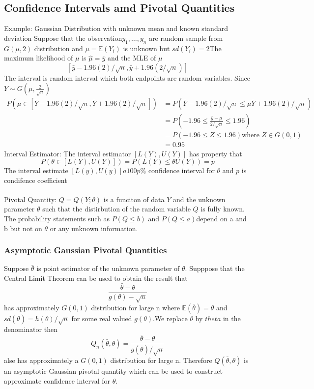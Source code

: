 \documentclass{article}
\newcommand{\E}{\mathbb{E}}
\begin{document}
\subsection{Confidence Intervals amd Pivotal Quantities}
Example: Gaussian Distribution with unknown mean and known standard deviation
Suppose that the observation$y_1, \dotsc, y_n$ are random sample from $G(\mu, 2)$ distribution and $\mu = \E(Y_i)$ is unknown but $sd(Y_i) = 2$The maximum likelihood of $\mu$ is $\hat{\mu} = \bar{y}$ and the MLE of $\mu$
\[
\left[\bar{y} - 1.96(2)/\sqrt{n}, \bar{y} + 1.96(2/\sqrt{n})\right]
\] 
The interval is random interval which both endpoints are random variables. Since $Y \sim G(\mu, \frac{2}{\sqrt{n}})$
\begin{align*}
    P\left(\mu \in \left[\bar{Y} - 1.96(2)/\sqrt{n}, \bar{Y}+ 1.96(2)/\sqrt{n}\right]\right) &= P(\bar{Y} - 1.96(2)/\sqrt{n} \le \mu \bar{Y} + 1.96(2)/\sqrt{n})\\
    &= P(-1.96\le \frac{\bar{y} -\mu}{2/\sqrt{n}} \le 1.96)\\
    &= P(-1.96 \le Z \le 1.96) \text{where }Z\in G(0,1)\\
    &= 0.95
\end{align*}
\noindent Interval Estimator: The interval estimator $\left[L(Y),U(Y)\right]$ has property that
\[
P(\theta \in \left[L(Y), U(Y)\right]) = P(L(Y) \le \theta U(Y)) = p
\]
The interval estimate $\left[L(y), U(y)\right] a100p\%$ confidence interval for $\theta$ and $p$ is condifence coefficient\\\\
\noindent Pivotal Quantity: $Q = Q(Y;\theta)$ is a funciton of data $Y$ and the unknown parameter $\theta$ such that the distirbution of the random variable $Q$ is fully known. The probability statements such as $P(Q\le b)$ and $P(Q\le a)$depend on a and b but not on $\theta$ or any unknown information.

\subsubsection{Asymptotic Gaussian Pivotal Quantities}
Suppose $\bar{\theta}$ is point estimator of the unknown parameter of $\theta$. Supppose that the Central Limit Theorem can be used to obtain the result that
\[
\frac{\bar{\theta} - \theta}{g(\theta) - \sqrt{n}}
\]
has approximately $G(0,1)$ distribution for large n where $\E(\bar{\theta}) = \theta$ and $sd(\bar{\theta}) = h(\theta)/\sqrt{n}$ for some real valued $g(\theta)$.We replace $\theta$ by $\bar{theta}$ in the denominator then
\[
Q_n(\bar{\theta},\theta) = \frac{\bar{\theta} - \theta}{g(\bar{\theta})/\sqrt{n}}
\]
alse has approximately a $G(0,1)$ distribution for large n. Therefore $Q(\bar{\theta},\theta)$ is an asymptotic Gaussian pivotal quantity which can be used to construct approximate confidence interval for $\theta$.
\end{document}
